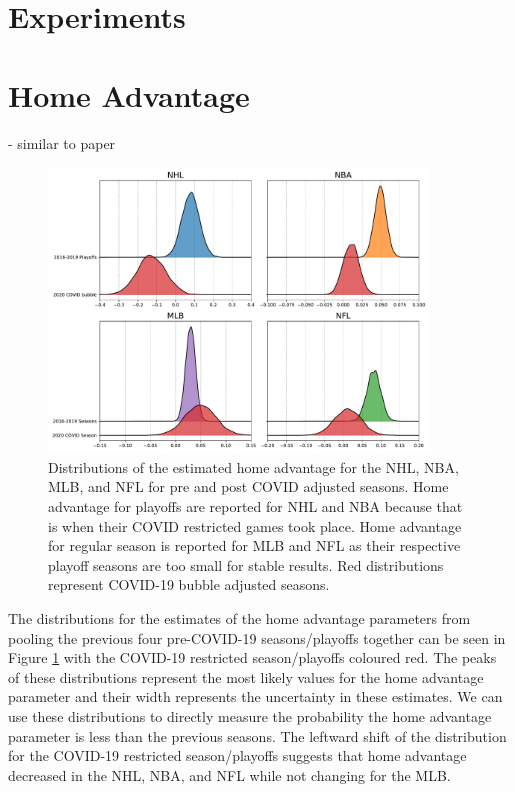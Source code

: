 \section{Experiments}

\section{Home Advantage}

- similar to paper

\begin{figure}
	\centering
	\includegraphics[width=0.9\textwidth]{figures/Figure_1.pdf}
	\caption{Distributions of the estimated home advantage for the NHL, NBA, MLB, and NFL for pre and post COVID adjusted seasons. Home advantage for playoffs are reported for NHL and NBA because that is when their COVID restricted games took place. Home advantage for regular season is reported for MLB and NFL as their respective playoff seasons are too small for stable results. Red distributions represent COVID-19 bubble adjusted seasons.}
	\label{fig:ha_pooled}
\end{figure}

The distributions for the estimates of the home advantage parameters from pooling the previous four pre-COVID-19 seasons/playoffs together can be seen in Figure \mbox{\ref{fig:ha_pooled}} with the COVID-19 restricted season/playoffs coloured red. The peaks of these distributions represent the most likely values for the home advantage parameter and their width represents the uncertainty in these estimates. We can use these distributions to directly measure the probability the home advantage parameter is less than the previous seasons. The leftward shift of the distribution for the COVID-19 restricted season/playoffs suggests that home advantage decreased in the NHL, NBA, and NFL while not changing for the MLB.

